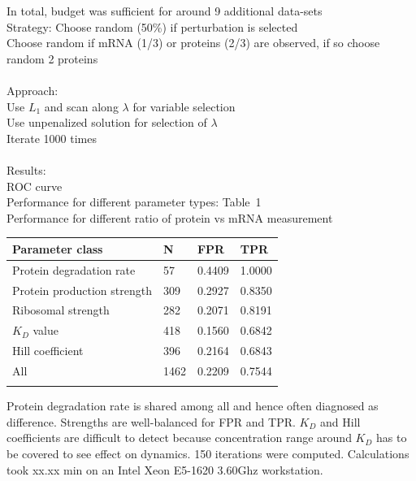 \documentclass{bioinfo}
\begin{document}
In total, budget was sufficient for around 9 additional data-sets\\
Strategy: Choose random (50\%) if perturbation is selected\\
Choose random if mRNA (1/3) or proteins (2/3) are observed, if so choose random 2 proteins\\ \\
Approach:\\
Use $L_1$ and scan along $\lambda$ for variable selection\\
Use unpenalized solution for selection of $\lambda$\\
Iterate 1000 times\\ \\
Results:\\
ROC curve\\
Performance for different parameter types: Table~1\vphantom{\ref{Tab:01}}\\
Performance for different ratio of protein vs mRNA measurement

\begin{table}[!t]
 {\begin{tabular}{@{}llll@{}}\toprule Parameter class &
N & FPR & TPR\\\midrule
Protein degradation rate & 57 & 0.4409 & 1.0000\\
Protein production strength & 309 & 0.2927 & 0.8350\\
Ribosomal strength & 282 & 0.2071 & 0.8191\\
$K_D$ value & 418 & 0.1560 & 0.6842\\
Hill coefficient & 396 & 0.2164 & 0.6843\\\hline
All & 1462 & 0.2209 & 0.7544\\\botrule
\end{tabular}}{Protein degradation rate is shared among all and hence often diagnosed as difference. Strengths are well-balanced for FPR and TPR. $K_D$ and Hill coefficients are difficult to detect because concentration range around $K_D$ has to be covered to see effect on dynamics. 150 iterations were computed. Calculations took xx.xx min on an Intel Xeon E5-1620 3.60Ghz workstation.}
\end{table}
\end{document}
